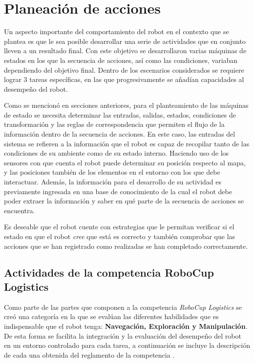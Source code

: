 \chapter{Planeación de acciones}
Un aspecto importante del comportamiento del robot en el contexto que se plantea es que le sea posible desarrollar una serie de actividades que en conjunto lleven a un resultado final.
Con este objetivo se desarrollaron varias máquinas de estados en los que la secuencia de acciones, así como las condiciones, variaban dependiendo del objetivo final. 
Dentro de los escenarios considerados se requiere lograr 3 tareas específicas, en las que progresivamente se añadían capacidades al desempeño del robot.

Como se mencionó en secciones anteriores, para el planteamiento de las máquinas de estado se necesita determinar las entradas, salidas, estados, condiciones de transformación y las reglas de correspondencia que permiten el flujo de la información dentro de la secuencia de acciones.
En este caso, las entradas del sistema se refieren a la información que el robot es capaz de recopilar tanto de las condiciones de su ambiente como de su estado interno.
Haciendo uso de los sensores con que cuenta el robot puede determinar su posición respecto al mapa, y las posiciones también de los elementos en el entorno con los que debe interactuar.
Además, la información para el desarrollo de su actividad es previamente ingresada en una base de conocimiento de la cual el robot debe poder extraer la información y saber en qué parte de la secuencia de acciones se encuentra.

Es deseable que el robot cuente con estrategias que le permitan verificar si el estado en que el robot \textit{cree} que está es correcto y también comprobar que las acciones que se han registrado como realizadas se han completado correctamente.

\section{Actividades de la competencia RoboCup Logistics}
Como parte de las partes que componen a la competencia \textit{RoboCup Logistics} se creó una categoría en la que se evalúan las diferentes habilidades que es indispensable que el robot tenga: \textbf{Navegación, Exploración y Manipulación}. De esta forma se facilita la integración y la evaluación del desempeño del robot en un entorno controlado para cada tarea, a continuación se incluye la descripción de cada una obtenida del reglamento de la competencia \cite{technical_committee_20122022_robocup_2022}.


